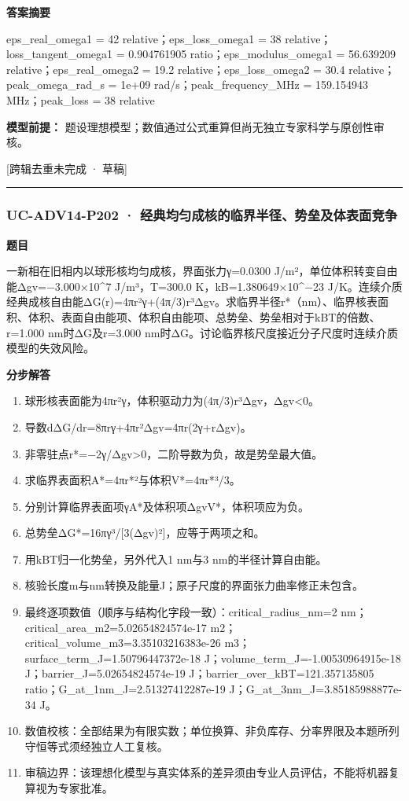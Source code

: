 \documentclass[UTF8,11pt,a4paper]{ctexart}
\begin{document}
\noindent\textbf{答案摘要}\par
eps\_real\_omega1 = 42 relative；eps\_loss\_omega1 = 38 relative；loss\_tangent\_omega1 = 0.904761905 ratio；eps\_modulus\_omega1 = 56.639209 relative；eps\_real\_omega2 = 19.2 relative；eps\_loss\_omega2 = 30.4 relative；peak\_omega\_rad\_s = 1e+09 rad/s；peak\_frequency\_MHz = 159.154943 MHz；peak\_loss = 38 relative\par
\noindent\textbf{模型前提：}
题设理想模型；数值通过公式重算但尚无独立专家科学与原创性审核。\par
\noindent\textcolor{red!65!black}{[跨辑去重未完成 · 草稿]} \par
\medskip\hrule\medskip
{}
\subsubsection*{UC-ADV14-P202 · 经典均匀成核的临界半径、势垒及体表面竞争}
\noindent\textbf{题目}\par
一新相在旧相内以球形核均匀成核，界面张力γ=0.0300 J/m²，单位体积转变自由能Δgv=−3.000×10\textasciicircum{}7 J/m³，T=300.0 K，kB=1.380649×10\textasciicircum{}−23 J/K。连续介质经典成核自由能ΔG(r)=4πr²γ+(4π/3)r³Δgv。求临界半径r*（nm）、临界核表面积、体积、表面自由能项、体积自由能项、总势垒、势垒相对于kBT的倍数、r=1.000 nm时ΔG及r=3.000 nm时ΔG。讨论临界核尺度接近分子尺度时连续介质模型的失效风险。\par
\medskip\noindent\textbf{分步解答}
\begin{enumerate}
\item 球形核表面能为4πr²γ，体积驱动力为(4π/3)r³Δgv，Δgv<0。
\item 导数dΔG/dr=8πrγ+4πr²Δgv=4πr(2γ+rΔgv)。
\item 非零驻点r*=−2γ/Δgv>0，二阶导数为负，故是势垒最大值。
\item 求临界表面积A*=4πr*²与体积V*=4πr*³/3。
\item 分别计算临界表面项γA*及体积项ΔgvV*，体积项应为负。
\item 总势垒ΔG*=16πγ³/[3(Δgv)²]，应等于两项之和。
\item 用kBT归一化势垒，另外代入1 nm与3 nm的半径计算自由能。
\item 核验长度m与nm转换及能量J；原子尺度的界面张力曲率修正未包含。
\item 最终逐项数值（顺序与结构化字段一致）：critical\_radius\_nm=2 nm；critical\_area\_m2=5.02654824574e-17 m2；critical\_volume\_m3=3.35103216383e-26 m3；surface\_term\_J=1.50796447372e-18 J；volume\_term\_J=-1.00530964915e-18 J；barrier\_J=5.02654824574e-19 J；barrier\_over\_kBT=121.357135805 ratio；G\_at\_1nm\_J=2.51327412287e-19 J；G\_at\_3nm\_J=3.85185988877e-34 J。
\item 数值校核：全部结果为有限实数；单位换算、非负库存、分率界限及本题所列守恒等式须经独立人工复核。
\item 审稿边界：该理想化模型与真实体系的差异须由专业人员评估，不能将机器复算视为专家批准。
\end{enumerate}
\end{document}
